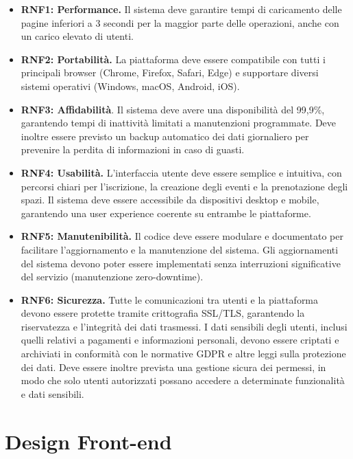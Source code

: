 \documentclass[9pt]{extarticle}
\begin{document}
\begin{itemize}
	\item \textbf{RNF1: Performance.} Il sistema deve garantire tempi di caricamento delle pagine inferiori a 3 secondi per la maggior parte delle operazioni, anche con un carico elevato di utenti.
	\item \textbf{RNF2: Portabilità.} La piattaforma deve essere compatibile con tutti i principali browser (Chrome, Firefox, Safari, Edge) e supportare diversi sistemi operativi (Windows, macOS, Android, iOS).
	\item \textbf{RNF3: Affidabilità}. Il sistema deve avere una disponibilità del 99,9\%, garantendo tempi di inattività limitati a manutenzioni programmate. Deve inoltre essere previsto un backup automatico dei dati giornaliero per prevenire la perdita di informazioni in caso di guasti.
	\item \textbf{RNF4: Usabilità.} L’interfaccia utente deve essere semplice e intuitiva, con percorsi chiari per l’iscrizione, la creazione degli eventi e la prenotazione degli spazi.
	Il sistema deve essere accessibile da dispositivi desktop e mobile, garantendo una user experience coerente su entrambe le piattaforme.
	\item \textbf{RNF5: Manutenibilità.} Il codice deve essere modulare e documentato per facilitare l'aggiornamento e la manutenzione del sistema. Gli aggiornamenti del sistema devono poter essere implementati senza interruzioni significative del servizio (manutenzione zero-downtime).
	\item \textbf{RNF6: Sicurezza.} Tutte le comunicazioni tra utenti e la piattaforma devono essere protette tramite crittografia SSL/TLS, garantendo la riservatezza e l’integrità dei dati trasmessi. I dati sensibili degli utenti, inclusi quelli relativi a pagamenti e informazioni personali, devono essere criptati e archiviati in conformità con le normative GDPR e altre leggi sulla protezione dei dati. Deve essere inoltre prevista una gestione sicura dei permessi, in modo che solo utenti autorizzati possano accedere a determinate funzionalità e dati sensibili.
\end{itemize}


\section{Design Front-end}
\end{document}
